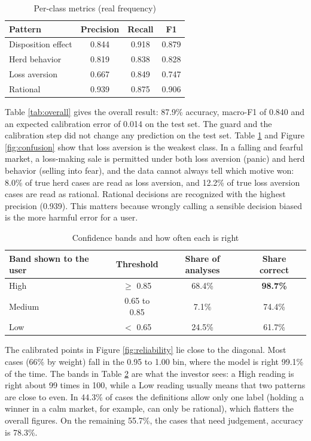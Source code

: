 \begin{table}[H]
\centering
\small
\begin{tabular}{|l|c|c|c|}
\hline
\textbf{Pattern} & \textbf{Precision} & \textbf{Recall} & \textbf{F1} \\
\hline
Disposition effect & 0.844 & 0.918 & 0.879 \\
\hline
Herd behavior & 0.819 & 0.838 & 0.828 \\
\hline
Loss aversion & 0.667 & 0.849 & 0.747 \\
\hline
Rational & 0.939 & 0.875 & 0.906 \\
\hline
\end{tabular}
\caption{Per-class metrics (real frequency)}
\label{tab:perclass}
\end{table}

Table \ref{tab:overall} gives the overall result: 87.9\% accuracy, macro-F1 of 0.840 and an expected calibration error of 0.014 on the test set. The guard and the calibration step did not change any prediction on the test set. Table \ref{tab:perclass} and Figure \ref{fig:confusion} show that loss aversion is the weakest class. In a falling and fearful market, a loss-making sale is permitted under both loss aversion (panic) and herd behavior (selling into fear), and the data cannot always tell which motive won: 8.0\% of true herd cases are read as loss aversion, and 12.2\% of true loss aversion cases are read as rational. Rational decisions are recognized with the highest precision (0.939). This matters because wrongly calling a sensible decision biased is the more harmful error for a user.

\begin{table}[H]
\centering
\small
\begin{tabular}{|l|c|c|c|}
\hline
\textbf{Band shown to the user} & \textbf{Threshold} & \textbf{Share of analyses} & \textbf{Share correct} \\
\hline
High & $\geq$ 0.85 & 68.4\% & \textbf{98.7\%} \\
\hline
Medium & 0.65 to 0.85 & 7.1\% & 74.4\% \\
\hline
Low & $<$ 0.65 & 24.5\% & 61.7\% \\
\hline
\end{tabular}
\caption{Confidence bands and how often each is right}
\label{tab:bands}
\end{table}

The calibrated points in Figure \ref{fig:reliability} lie close to the diagonal. Most cases (66\% by weight) fall in the 0.95 to 1.00 bin, where the model is right 99.1\% of the time. The bands in Table \ref{tab:bands} are what the investor sees: a High reading is right about 99 times in 100, while a Low reading usually means that two patterns are close to even. In 44.3\% of cases the definitions allow only one label (holding a winner in a calm market, for example, can only be rational), which flatters the overall figures. On the remaining 55.7\%, the cases that need judgement, accuracy is 78.3\%.

